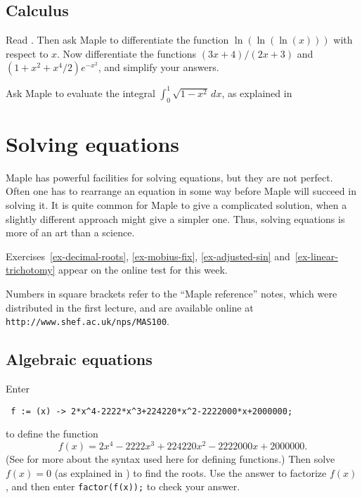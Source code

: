 \documentclass[a4paper,10pt]{amsbook}
\numberwithin{example}{chapter}
\begin{document}
\section{Calculus}

\begin{exercise}
 Read \note{\NOTEdiff,\NOTEdiffvar}.  Then ask Maple to
 differentiate the function $\ln(\ln(\ln(x)))$ with respect
 to $x$.  Now differentiate the functions $(3x+4)/(2x+3)$
 and $(1+x^2+x^4/2)e^{-x^2}$, and simplify your answers.
\end{exercise}

\begin{exercise}
 Ask Maple to evaluate the integral
 $\int_0^1\sqrt{1-x^2}\,dx$, as explained in \note{\NOTEdefint}
\end{exercise}

\chapter{Solving equations} 

Maple has powerful facilities for solving equations, but they are not
perfect.  Often one has to rearrange an equation in some way before
Maple will succeed in solving it.  It is quite common for Maple to
give a complicated solution, when a slightly different approach might
give a simpler one.  Thus, solving equations is more of an art than a
science.  

Exercises~\ref{ex-decimal-roots}, \ref{ex-mobius-fix},
\ref{ex-adjusted-sin} and~\ref{ex-linear-trichotomy} appear on the
online test for this week.

Numbers in square brackets refer to the ``Maple
reference'' notes, which were distributed in the first lecture, and
are available online at \verb~http://www.shef.ac.uk/nps/MAS100~.

\section{Algebraic equations}

\begin{exercise}\label{ex-decimal-roots}
 Enter
\begin{verbatim}
 f := (x) -> 2*x^4-2222*x^3+224220*x^2-2222000*x+2000000;
\end{verbatim}
 to define the function
 \[ f(x) = 2x^4-2222x^3+224220x^2-2222000x+2000000. \]
 (See \note{\NOTEarrow -- \NOTEshowfuncdef} for more about
 the syntax used here for defining functions.) Then solve 
 $f(x)=0$ (as explained in \note{\NOTEsolve})
 to find the roots.  Use the answer to factorize $f(x)$, and then
 enter \verb~factor(f(x));~ to check your answer.
\end{exercise}
\end{document}

